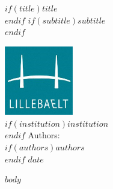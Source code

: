 \documentclass[12pt,a4paper]{scrartcl}
\begin{document}
\thispagestyle{empty}

\begin{center}
  \hfill \break%
  \vfill
  $if(title)$\Huge\textbf{$title$}\\[0.5em]$endif$
  $if(subtitle)$\Large{$subtitle$}\\[0.5em]$endif$
\end{center}


\begin{flushright}
    \vspace{8cm}\includegraphics[width=3cm, height=3cm]{eal-logo}\\
    $if(institution)${$institution$}\\$endif$
    \vspace{1cm}\large{Authors:}\\
    $if(authors)$\small{$authors$}\\$endif$
     \vspace{1cm}\textbf{{$date$}}\\
\end{flushright}

\newpage
\thispagestyle{empty}

\setcounter{secnumdepth}{3}
\setcounter{tocdepth}{3}
\tableofcontents
\newpage

$body$
\end{document}
